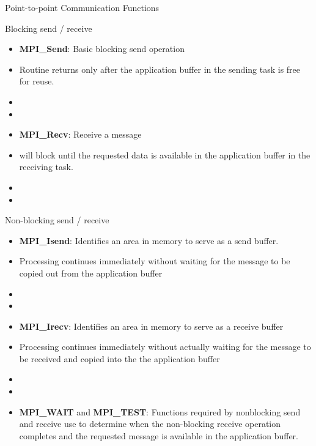 \documentclass[10pt,t]{beamer}
\begin{document}
\begin{frame}{Point-to-point Communication Functions}
  \begin{block}{Blocking send / receive}
    \begin{itemize}
      \item \textbf{MPI\_Send}: Basic blocking send operation
      \item Routine returns only after the application buffer in the sending task is free for reuse.
      \item[] 
      \item[] 
    \end{itemize}

    \begin{itemize}
      \item \textbf{MPI\_Recv}: Receive a message 
      \item will block until the requested data is available in the application buffer in the receiving task.
      \item[] 
      \item[] 
    \end{itemize}
  \end{block}

  \framebreak

  \begin{block}{Non-blocking send / receive}
    \begin{itemize}
      \item \textbf{MPI\_Isend}: Identifies an area in memory to serve as a send buffer.
      \item Processing continues immediately without waiting for the message to be copied out from the application buffer
      \item[] 
      \item[] 
      \item \textbf{MPI\_Irecv}: Identifies an area in memory to serve as a receive buffer
      \item Processing continues immediately without actually waiting for the message to be received and copied into the the application buffer
      \item[] 
      \item[] 
      \item \textbf{MPI\_WAIT} and \textbf{MPI\_TEST}: Functions required by nonblocking send and receive use to determine when the non-blocking receive operation completes and the requested message is available in the application buffer.
    \end{itemize}
  \end{block}
\end{frame}
\end{document}

